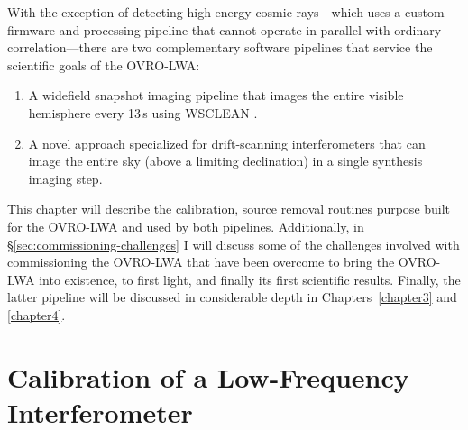 \begin{bibunit}
With the exception of detecting high energy cosmic rays---which uses a custom firmware and
processing pipeline that cannot operate in parallel with ordinary correlation---there are two
complementary software pipelines that service the scientific goals of the OVRO-LWA:
\begin{enumerate}
    \item A widefield snapshot imaging pipeline that images the entire visible hemisphere every
        13\,s using WSCLEAN \citep{2014MNRAS.444..606O}.
    \item A novel approach specialized for drift-scanning interferometers that can image the entire
        sky (above a limiting declination) in a single synthesis imaging step.
\end{enumerate}
This chapter will describe the calibration, source removal routines purpose built for the OVRO-LWA
and used by both pipelines. Additionally, in \S\ref{sec:commissioning-challenges} I will discuss
some of the challenges involved with commissioning the OVRO-LWA that have been overcome to bring the
OVRO-LWA into existence, to first light, and finally its first scientific results.  Finally, the
latter pipeline will be discussed in considerable depth in Chapters~\ref{chapter3} and
\ref{chapter4}.

\section{Calibration of a Low-Frequency Interferometer}


\end{bibunit}
